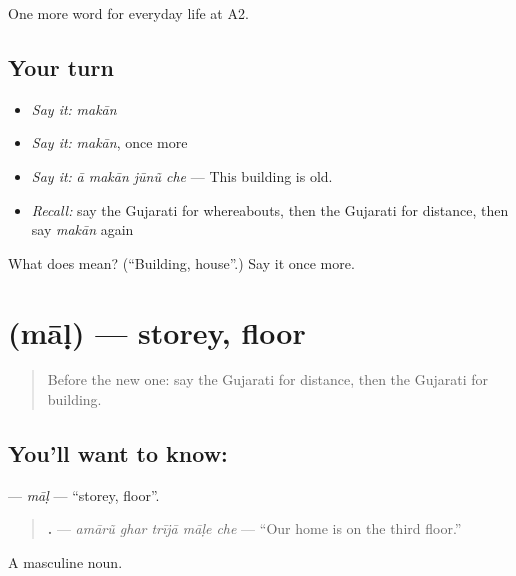 \begin{grammarlens}[title={What you've built}]
One more word for everyday life at A2.
\end{grammarlens}

\subsection*{Your turn}
\begin{itemize}
\raggedright
  \item \emph{Say it:} \emph{makān}
  \item \emph{Say it:} \emph{makān}, once more
  \item \emph{Say it:} \emph{ā makān jūnũ che} — This building is old.
  \item \emph{Recall:} say the Gujarati for whereabouts, then the Gujarati for distance, then say \emph{makān} again
\end{itemize}

\begin{tcolorbox}[breakable,colback=teal!4,colframe=teal!35!black,title={Before you move on}]
What does  mean? (\textquotedblleft{}Building, house\textquotedblright{}.) Say it once more.
\end{tcolorbox}
\section[\texorpdfstring{\gu{માળ} (māḷ)}{માળ (māḷ)}]{ (māḷ) — storey, floor}

\label{lesson:GU-C196-mal-storey}



\begin{quote}
Before the new one: say the Gujarati for distance, then the Gujarati for building.
\end{quote}

\subsection*{You'll want to know: }
\textbf{} — \emph{māḷ} — \textquotedblleft{}storey, floor\textquotedblright{}.

\begin{quote}
\textbf{    .} — \emph{amārũ ghar trījā māḷe che} — \textquotedblleft{}Our home is on the third floor.\textquotedblright{}
\end{quote}

A masculine noun.

